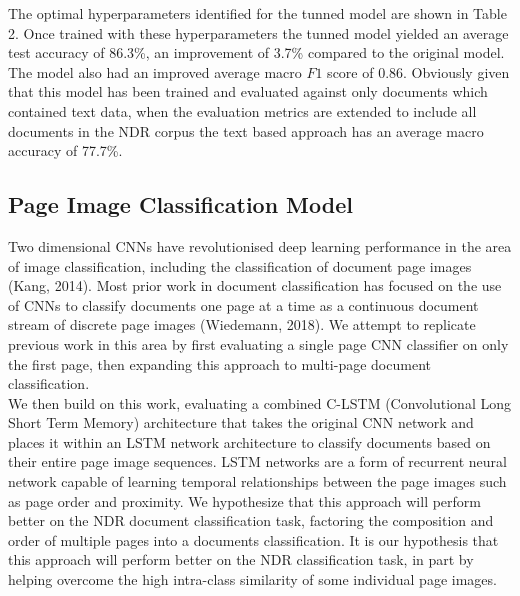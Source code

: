 \documentclass[a4paper,12pt]{article}
\begin{document}
The optimal hyperparameters identified for the tunned model are shown in Table 2. Once trained with these hyperparameters the tunned model yielded an average test accuracy of 86.3\%, an improvement of 3.7\% compared to the original model. The model also had an improved average macro $F1$ score of 0.86. Obviously given that this model has been trained and evaluated against only documents which contained text data, when the evaluation metrics are extended to include all documents in the NDR corpus the text based approach has an average macro accuracy of 77.7\%.

\subsection{Page Image Classification Model}
Two dimensional CNNs have revolutionised deep learning performance in the area of image classification, including the classification of document page images (Kang, 2014). Most prior work in document classification has focused on the use of CNNs to classify documents one page at a time as a continuous document stream of discrete page images (Wiedemann, 2018). We attempt to replicate previous work in this area by first evaluating a single page CNN classifier on only the first page, then expanding this approach to multi-page document classification. \\

We then build on this work, evaluating a combined C-LSTM (Convolutional Long Short Term Memory) architecture that takes the original CNN network and places it within an LSTM network architecture to classify documents based on their entire page image sequences. LSTM networks are a form of recurrent neural network capable of learning temporal relationships between the page images such as page order and proximity. We hypothesize that this approach will perform better on the NDR document classification task, factoring the composition and order of multiple pages into a documents classification. It is our hypothesis that this approach will perform better on the NDR classification task, in part by helping overcome the high intra-class similarity of some individual page images. \\
\end{document}
